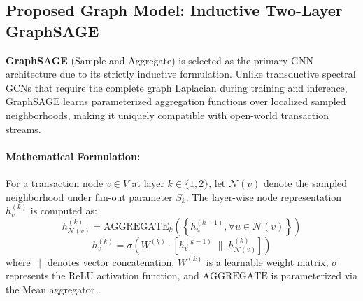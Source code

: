 \documentclass[11pt,a4paper]{article}
\begin{document}
\subsection{Proposed Graph Model: Inductive Two-Layer GraphSAGE}
\textbf{GraphSAGE} (Sample and Aggregate) \cite{hamilton2017inductive} is selected as the primary GNN architecture due to its strictly inductive formulation. Unlike transductive spectral GCNs that require the complete graph Laplacian during training and inference, GraphSAGE learns parameterized aggregation functions over localized sampled neighborhoods, making it uniquely compatible with open-world transaction streams.

\paragraph{Mathematical Formulation:} For a transaction node $v \in V$ at layer $k \in \{1, 2\}$, let $\mathcal{N}(v)$ denote the sampled neighborhood under fan-out parameter $S_k$. The layer-wise node representation $h_v^{(k)}$ is computed as:
\begin{equation}
h_{\mathcal{N}(v)}^{(k)} = \text{AGGREGATE}_k \left( \left\{ h_u^{(k-1)}, \forall u \in \mathcal{N}(v) \right\} \right)
\end{equation}
\begin{equation}
h_v^{(k)} = \sigma \left( W^{(k)} \cdot \left[ h_v^{(k-1)} \;\big\|\; h_{\mathcal{N}(v)}^{(k)} \right] \right)
\end{equation}
where $\big\|$ denotes vector concatenation, $W^{(k)}$ is a learnable weight matrix, $\sigma$ represents the ReLU activation function, and $\text{AGGREGATE}$ is parameterized via the Mean aggregator \cite{hamilton2017inductive}.
\end{document}
